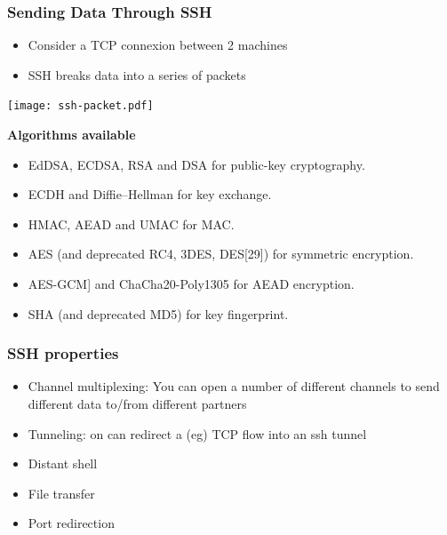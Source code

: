 \documentclass[
hyperref={pdfpagelabels=false}
,xcolor=table
]
{beamer}
\begin{document}
\begin{frame}
  \frametitle{Sending Data Through SSH}
  \begin{itemize}
  \item Consider a TCP connexion between 2 machines
  \item SSH breaks data into a series of packets
  \end{itemize}

  \begin{center}
    \texttt{[image: ssh-packet.pdf]}
  \end{center}

  {\scriptsize   \textbf{Algorithms available}
    \begin{itemize}
    \item EdDSA, ECDSA, RSA and DSA for public-key cryptography.
    \item ECDH and Diffie–Hellman for key exchange.
    \item HMAC, AEAD and UMAC for MAC.
    \item AES (and deprecated RC4, 3DES, DES[29]) for symmetric encryption.
    \item AES-GCM] and ChaCha20-Poly1305 for AEAD encryption.
    \item SHA (and deprecated MD5) for key fingerprint.
    \end{itemize}
  }
\end{frame}

\begin{frame}
  \frametitle{SSH properties}
  \begin{itemize}
  \item Channel multiplexing: You can open a number of different channels to send different
    data to/from different partners
  \item Tunneling: on can redirect a (eg) TCP flow into an ssh tunnel 
  \item Distant shell
  \item File transfer
  \item Port redirection
  \end{itemize}
\end{frame}
\end{document}
